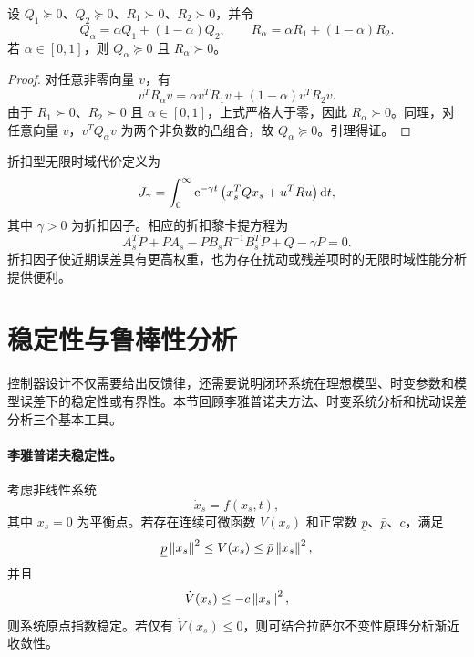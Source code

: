 \begin{lemma}[加权代价的正定性]
\label{lem:ch2_weight_positive}
设 $Q_1\succeq0$、$Q_2\succeq0$、$R_1\succ0$、$R_2\succ0$，并令
\begin{equation}
  Q_\alpha=\alpha Q_1+(1-\alpha)Q_2,
  \qquad
  R_\alpha=\alpha R_1+(1-\alpha)R_2 .
\end{equation}
若 $\alpha\in[0,1]$，则 $Q_\alpha\succeq0$ 且 $R_\alpha\succ0$。
\end{lemma}

\begin{proof}
对任意非零向量 $v$，有
\begin{equation}
  v^TR_\alpha v=\alpha v^TR_1v+(1-\alpha)v^TR_2v .
\end{equation}
由于 $R_1\succ0$、$R_2\succ0$ 且 $\alpha\in[0,1]$，上式严格大于零，因此 $R_\alpha\succ0$。同理，对任意向量 $v$，$v^TQ_\alpha v$ 为两个非负数的凸组合，故 $Q_\alpha\succeq0$。引理得证。
\end{proof}

折扣型无限时域代价定义为
\begin{equation}
  J_\gamma=\int_0^\infty \mathrm{e}^{-\gamma t}\left(x_s^TQx_s+u^TRu\right)\mathrm{d} t,
  \label{eq:ch2_discount_cost}
\end{equation}
其中 $\gamma>0$ 为折扣因子。相应的折扣黎卡提方程为
\begin{equation}
  A_s^TP+PA_s-PB_sR^{-1}B_s^TP+Q-\gamma P=0 .
  \label{eq:ch2_discount_are}
\end{equation}
折扣因子使近期误差具有更高权重，也为存在扰动或残差项时的无限时域性能分析提供便利。

\section{稳定性与鲁棒性分析}
\label{sec:ch2_stability}

控制器设计不仅需要给出反馈律，还需要说明闭环系统在理想模型、时变参数和模型误差下的稳定性或有界性。本节回顾李雅普诺夫方法、时变系统分析和扰动误差分析三个基本工具。

\paragraph{李雅普诺夫稳定性。}
\label{subsec:ch2_lyapunov}

考虑非线性系统
\begin{equation}
  \dot x_s=f(x_s,t),
  \label{eq:ch2_nonlinear_system}
\end{equation}
其中 $x_s=0$ 为平衡点。若存在连续可微函数 $V(x_s)$ 和正常数 $\underline p$、$\bar p$、$c$，满足
\begin{equation}
  \underline p\left\lVert x_s\right\rVert^2\le V(x_s)\le \bar p\left\lVert x_s\right\rVert^2,
  \label{eq:ch2_lyap_bounds}
\end{equation}
并且
\begin{equation}
  \dot V(x_s)\le -c\left\lVert x_s\right\rVert^2,
  \label{eq:ch2_lyap_decay}
\end{equation}
则系统原点指数稳定。若仅有 $\dot V(x_s)\le0$，则可结合拉萨尔不变性原理分析渐近收敛性。

